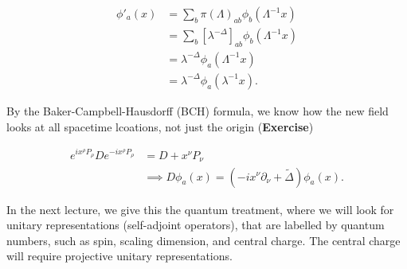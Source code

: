 \begin{align}
\phi'_a (x) &= \sum_b \pi(\Lambda)_{ab} \phi_b (\Lambda^{-1} x) \\
&= \sum_b [ \lambda^{-\Delta}]_{ab} \phi_b (\Lambda^{-1} x) \\
&= \lambda^{-\Delta} \phi_a (\Lambda^{-1} x) \\
&= \lambda^{-\Delta} \phi_a (\lambda^{-1} x).
\end{align}

\noindent By the Baker-Campbell-Hausdorff (BCH) formula, we know how the new field looks at all spacetime lcoations, not just the origin (\textbf{Exercise})

\begin{align}
e^{i x^\rho P_\rho} D e^{-i x^\rho P_\rho} &= D + x^\nu P_\nu \\
&\implies D \phi_a (x) = (-i x^\nu \partial_\nu + \tilde{\Delta} ) \phi_a (x).
\end{align}

\noindent In the next lecture, we give this the quantum treatment, where we will look for unitary representations (self-adjoint operators), that are labelled by quantum numbers, such as spin, scaling dimension, and central charge. The central charge will require projective unitary representations.
